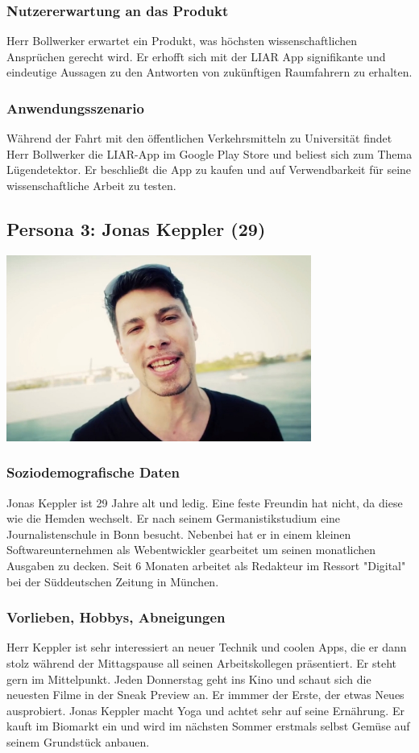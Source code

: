 \documentclass[10pt, a4paper, oneside, titlepage]{scrartcl} %
\begin{document}
	\subsubsection{Nutzererwartung an das Produkt}
	Herr Bollwerker erwartet ein Produkt, was höchsten wissenschaftlichen Ansprüchen gerecht wird. Er erhofft sich mit der LIAR App signifikante und eindeutige Aussagen zu den Antworten von zukünftigen Raumfahrern zu erhalten.
	\subsubsection{Anwendungsszenario}
	Während der Fahrt mit den öffentlichen Verkehrsmitteln zu Universität findet Herr Bollwerker die LIAR-App im Google Play Store und beliest sich zum Thema Lügendetektor. Er beschließt die App zu kaufen und auf Verwendbarkeit für seine wissenschaftliche Arbeit zu testen.
	
	\subsection{Persona 3: Jonas Keppler (29)}
	\begin{center}
		\includegraphics[width=10.0cm]{persona_03.jpg}
	\end{center}
	\subsubsection{Soziodemografische Daten}
	Jonas Keppler ist 29 Jahre alt und ledig. Eine feste Freundin hat nicht, da diese wie die Hemden wechselt. Er nach seinem Germanistikstudium eine Journalistenschule in Bonn besucht. Nebenbei hat er in einem kleinen Softwareunternehmen als Webentwickler gearbeitet um seinen monatlichen Ausgaben zu decken. Seit 6 Monaten arbeitet als Redakteur im Ressort "Digital" bei der Süddeutschen Zeitung in München.
	\subsubsection{Vorlieben, Hobbys, Abneigungen}
	Herr Keppler ist sehr interessiert an neuer Technik und coolen Apps, die er dann stolz während der Mittagspause all seinen Arbeitskollegen präsentiert. Er 	steht gern im Mittelpunkt. Jeden Donnerstag geht ins Kino und schaut sich die neuesten Filme in der Sneak Preview an. Er immmer der Erste, der etwas Neues ausprobiert. Jonas Keppler macht Yoga und achtet sehr auf seine Ernährung. Er kauft im Biomarkt ein und wird im nächsten Sommer erstmals selbst Gemüse auf seinem Grundstück anbauen.
\end{document}
